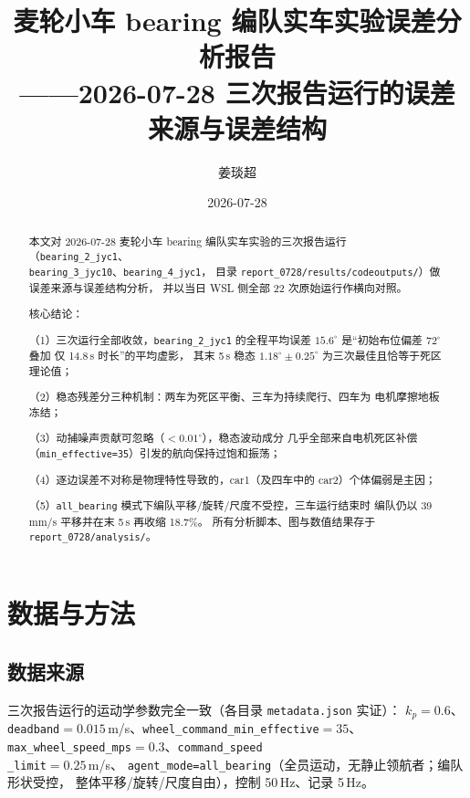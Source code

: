 \documentclass[11pt,a4paper]{ctexart}
\title{\textbf{麦轮小车 bearing 编队实车实验误差分析报告}\\[2pt]
\large ——2026-07-28 三次报告运行的误差来源与误差结构}
\author{姜琰超}
\date{2026-07-28}
\newcommand{\run}[1]{\texttt{#1}}
\newcommand{\file}[1]{\texttt{#1}}
\newcommand{\degC}{^\circ}
\begin{document}
\maketitle

\begin{abstract}
本文对 2026-07-28 麦轮小车 bearing 编队实车实验的三次报告运行
（\run{bearing\_2\_jyc1}、\\ \run{bearing\_3\_jyc10}、\run{bearing\_4\_jyc1}，
目录 \file{report\_0728/results/codeoutputs/}）做误差来源与误差结构分析，
并以当日 WSL 侧全部 22 次原始运行作横向对照。

核心结论：

（1）三次运行全部收敛，\run{bearing\_2\_jyc1} 的全程平均误差
$15.6\degC$ 是“初始布位偏差 $72\degC$ 叠加 仅 14.8\,s 时长”的平均虚影，
其末 5\,s 稳态 $1.18\degC\pm0.25\degC$ 为三次最佳且恰等于死区理论值；

（2）稳态残差分三种机制：两车为死区平衡、三车为持续爬行、四车为
电机摩擦地板冻结；

（3）动捕噪声贡献可忽略（$<0.01\degC$），稳态波动成分
几乎全部来自电机死区补偿\\（\texttt{min\_effective=35}）引发的航向保持过饱和振荡；

（4）逐边误差不对称是物理特性导致的，car1（及四车中的 car2）个体偏弱是主因；

（5）\texttt{all\_bearing} 模式下编队平移/旋转/尺度不受控，三车运行结束时
编队仍以 39\,mm/s 平移并在末 5\,s 再收缩 18.7\%。
所有分析脚本、图与数值结果存于 \file{report\_0728/analysis/}。
\end{abstract}

\section{数据与方法}

\subsection{数据来源}

三次报告运行的运动学参数完全一致（各目录 \file{metadata.json} 实证）：
$k_p=0.6$、\texttt{deadband}$=0.015$\,m/s、\texttt{wheel\_command\_min\_effective}$=35$、
\texttt{max\_wheel\_speed\_mps}$=0.3$、\texttt{command\_speed\\\_limit}$=0.25$\,m/s、
\texttt{agent\_mode=all\_bearing}（全员运动，无静止领航者；编队形状受控，
整体平移/旋转/尺度自由），控制 50\,Hz、记录 5\,Hz。
\end{document}
